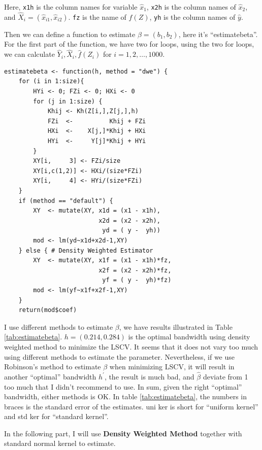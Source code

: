 \documentclass{article}
\begin{document}
Here, \lstinline|x1h| is the column names for variable $\hat{x}_{1}$, \lstinline|x2h| is the column names of $\hat{x}_{2}$, and $\hat{X}_{i}=(\hat{x}_{i1},\hat{x}_{i2})$. \lstinline|fz| is the name of $\hat{f}(Z)$, \lstinline|yh| is the column names of $\hat{y}$.

Then we can define a function to estimate $\beta=(b_{1},b_{2})$, here it\rq{}s ``estimatebeta''.  For the first part of the function, we have two for loops, using the two for loops, we can calculate $\hat{Y}_{i},\hat{X}_{i},\hat{f}(Z_{i})$ for $i=1,2,\ldots,1000$.
\begin{lstlisting}
estimatebeta <- function(h, method = "dwe") {
    for (i in 1:size){
        HYi <- 0; FZi <- 0; HXi <- 0
        for (j in 1:size) {
            Khij <- Kh(Z[i,],Z[j,],h)
            FZi  <-          Khij + FZi
            HXi  <-    X[j,]*Khij + HXi
            HYi  <-     Y[j]*Khij + HYi
        }
        XY[i,     3] <- FZi/size
        XY[i,c(1,2)] <- HXi/(size*FZi)
        XY[i,     4] <- HYi/(size*FZi)
    }
    if (method == "default") {
        XY  <- mutate(XY, x1d = (x1 - x1h),
                          x2d = (x2 - x2h),
                           yd = ( y -  yh))
        mod <- lm(yd~x1d+x2d-1,XY)
    } else { # Density Weighted Estimator
        XY  <- mutate(XY, x1f = (x1 - x1h)*fz,
                          x2f = (x2 - x2h)*fz,
                           yf = ( y -  yh)*fz)
        mod <- lm(yf~x1f+x2f-1,XY)
    }
    return(mod$coef)
\end{lstlisting}

I use different methods to estimate $\beta$, we have results illustrated in Table \ref{tab:estimatebeta}. $h=(0.214,0.284)$ is the optimal bandwidth using density weighted method to minimize the LSCV. It seems that it does not vary too much using different methods to estimate the parameter. Nevertheless, if we use Robinson's method to estimate $\beta$ when minimizing LSCV, it will result in another ``optimal'' bandwidth $h^{\prime}$, the result is much bad, and $\hat{\beta}$ deviate from 1 too much that I didn't recommend to use. In sum, given the right ``optimal'' bandwidth, either methods is OK. In table \ref{tab:estimatebeta}, the numbers in braces is the standard error of the estimates. uni ker is short for ``uniform kernel'' and std ker for ``standard kernel''.

In the following part, I will use \textbf{Density Weighted Method} together with standard normal kernel to estimate.
\end{document}
